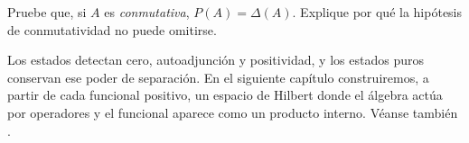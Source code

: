 \begin{ejercicio}\label{ej:v3-l28-7}
Pruebe que, si $A$ es \emph{conmutativa}, $P(A)=\Delta(A)$. Explique por qué la hipótesis de conmutatividad no puede omitirse.
\end{ejercicio}


Los estados detectan cero, autoadjunción y positividad, y los estados puros conservan ese poder de separación. En el siguiente capítulo construiremos, a partir de cada funcional positivo, un espacio de Hilbert donde el álgebra actúa por operadores y el funcional aparece como un producto interno. Véanse también \cite{murphy1990,zhu1993,conway1990}.
